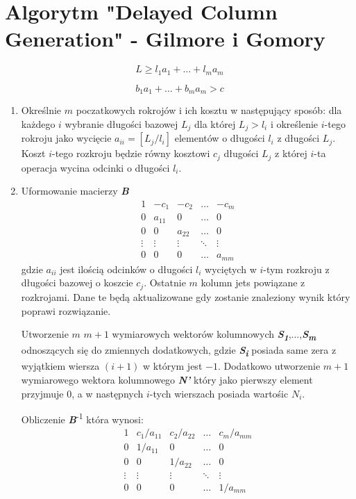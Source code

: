 \newcommand{\mf}[1]{\textbf{\textit{#1}}}
\newcommand{\tsub}[1]{\textsubscript{#1}}
\newcommand{\tsuper}[1]{\textsuperscript{#1}}
\section{Algorytm "Delayed Column Generation" - Gilmore i Gomory}

\begin{equation}\label{length_eq}
L \ge l_1a_1+\dots+l_ma_m
\end{equation}

\begin{equation}\label{cost_eq}
b_1a_1+\dots+b_ma_m > c
\end{equation}

\begin{enumerate}
\item Określnie $m$ poczatkowych rokrojów i ich kosztu w następujący sposób: dla każdego $i$ wybranie długości bazowej $L_j$ dla której $L_j > l_i$ i określenie $i$-tego rokroju jako wycięcie $a_{ii} = [L_j / l_i]$ elementów o długości $l_i$ z długości $L_j$. Koszt $i$-tego rozkroju będzie równy kosztowi $c_j$ długości $L_j$ z której $i$-ta operacja wycina odcinki o długości $l_i$.
\item Uformowanie macierzy \mf{B}
\[
\begin{matrix}
1 & -c_1  & -c_2  & \dots & -c_m \\
0 & a_{11}  & 0 & \dots & 0 \\
0 & 0 & a_{22}  & \dots & 0 \\
\vdots&\vdots&\vdots&\ddots&\vdots \\
0 & 0 & 0 & \dots & a_{mm}
\end{matrix}
\]
gdzie $a_{ii}$ jest ilością odcinków o długości $l_i$ wyciętych w $i$-tym rozkroju z długości bazowej o koszcie $c_j$. Ostatnie $m$ kolumn jets powiązane z rozkrojami. Dane te będą aktualizowane gdy zostanie znaleziony wynik który poprawi rozwiązanie.

Utworzenie $m$ $m+1$ wymiarowych wektorów kolumnowych \mf{S\tsub{1}},...,\mf{S\tsub{m}} odnoszących się do zmiennych dodatkowych, gdzie \mf{S\tsub{i}} posiada same zera z wyjątkiem wiersza $(i+1)$ w którym jest $-1$. Dodatkowo utworzenie $m+1$ wymiarowego wektora kolumnowego \mf{N'} który jako pierwszy element przyjmuje 0, a w następnych $i$-tych wierszach posiada wartośic $N_i$.

Obliczenie \mf{B}\tsuper{-1} która wynosi:
\[
\begin{matrix}
1 & c_1/a_{11}  & c_2/a_{22}  & \dots & c_m/a_{mm} \\
0 & 1/a_{11}  & 0 & \dots & 0 \\
0 & 0 & 1/a_{22}  & \dots & 0 \\
\vdots&\vdots&\vdots&\ddots&\vdots \\
0 & 0 & 0 & \dots & 1/a_{mm}
\end{matrix}
\]


\end{enumerate}
